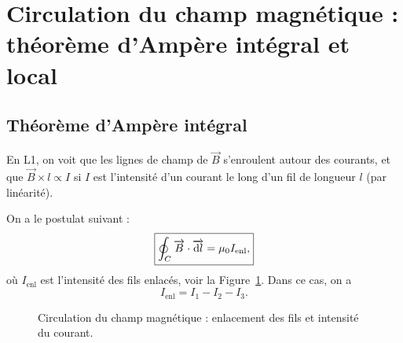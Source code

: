 \section[Circulation du champ magnétique]{Circulation du champ magnétique : théorème d'Ampère intégral et local}

    \subsection{Théorème d'Ampère intégral}

        En L1, on voit que les lignes de champ de $\vec{B}$ s'enroulent autour des courants, et que $\vec{B}\times l\propto I$ si $I$ est l'intensité d'un courant le long d'un fil de longueur $l$ (par linéarité).

        On a le postulat suivant :
        \begin{equation}
            \boxed{
                \oint_{C}\protect\overrightarrow{{B}}\cdot\protect\overrightarrow{{\mathrm{d} l}}=\mu_0 I_{\text{enl}},
            }
        \end{equation}
        où $I_{\text{enl}}$ est l'intensité des fils \og enlacés\fg, voir la Figure~\ref{fig:intensite_fil_enlances_circulation_champ_magnetique}. Dans ce cas, on a 
        \begin{equation}
            I_{\text{enl}}=I_1-I_2-I_3.
        \end{equation}

        \begin{figure}
            \centering
            \caption{Circulation du champ magnétique : enlacement des fils et intensité du courant.}
            \label{fig:intensite_fil_enlances_circulation_champ_magnetique}
        \end{figure}

